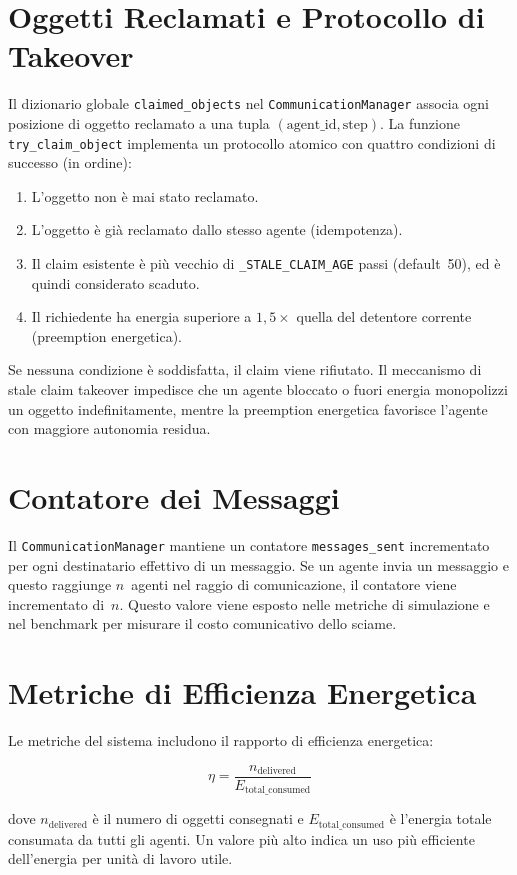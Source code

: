 \section{Oggetti Reclamati e Protocollo di Takeover}

Il dizionario globale \texttt{claimed\_objects} nel \texttt{CommunicationManager}
associa ogni posizione di oggetto reclamato a una tupla
$(\text{agent\_id}, \text{step})$. La funzione \texttt{try\_claim\_object} implementa
un protocollo atomico con quattro condizioni di successo (in ordine):

\begin{enumerate}
    \item L'oggetto non \`e mai stato reclamato.
    \item L'oggetto \`e gi\`a reclamato dallo stesso agente (idempotenza).
    \item Il claim esistente \`e pi\`u vecchio di \texttt{\_STALE\_CLAIM\_AGE} passi
          (default~50), ed \`e quindi considerato scaduto.
    \item Il richiedente ha energia superiore a $1{,}5\times$ quella del detentore
          corrente (preemption energetica).
\end{enumerate}

Se nessuna condizione \`e soddisfatta, il claim viene rifiutato. Il meccanismo di
stale claim takeover impedisce che un agente bloccato o fuori energia monopolizzi
un oggetto indefinitamente, mentre la preemption energetica favorisce l'agente
con maggiore autonomia residua.

\section{Contatore dei Messaggi}

Il \texttt{CommunicationManager} mantiene un contatore \texttt{messages\_sent}
incrementato per ogni destinatario effettivo di un messaggio. Se un agente invia
un messaggio e questo raggiunge $n$~agenti nel raggio di comunicazione, il contatore
viene incrementato di~$n$. Questo valore viene esposto nelle metriche di simulazione
e nel benchmark per misurare il costo comunicativo dello sciame.

\section{Metriche di Efficienza Energetica}

Le metriche del sistema includono il rapporto di efficienza energetica:

$$\eta = \frac{n_{\text{delivered}}}{E_{\text{total\_consumed}}}$$

dove $n_{\text{delivered}}$ \`e il numero di oggetti consegnati e $E_{\text{total\_consumed}}$
\`e l'energia totale consumata da tutti gli agenti. Un valore pi\`u alto indica un uso
pi\`u efficiente dell'energia per unit\`a di lavoro utile.
